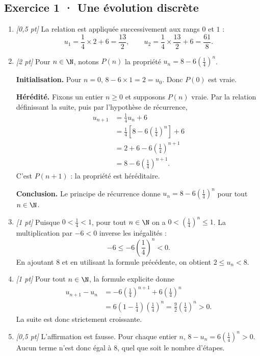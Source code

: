 \subsection*{Exercice 1 · Une évolution discrète}\begin{enumerate}

\item \textit{[0{,}5 pt]} La relation est appliquée successivement aux rangs $0$ et $1$ :\[u_1=\frac{1}{4}\times 2+6=\frac{13}{2},\qquad u_2=\frac{1}{4}\times \frac{13}{2}+6=\frac{61}{8}.\]

\item \textit{[2 pt]} Pour $n\in\N$, notons $P(n)$ la propriété $u_n=8-6\left(\frac{1}{4}\right)^n$.
\par\smallskip\textbf{Initialisation.} Pour $n=0$, $8-6\times1=2=u_0$. Donc $P(0)$ est vraie.
\par\smallskip\textbf{Hérédité.} Fixons un entier $n\ge0$ et supposons $P(n)$ vraie. Par la relation définissant la suite, puis par l'hypothèse de récurrence,
\[\begin{aligned}u_{n+1}&=\frac{1}{4}u_n+6\\
&=\frac{1}{4}\left[8-6\left(\frac{1}{4}\right)^n\right]+6\\
&=2+6-6\left(\frac{1}{4}\right)^{n+1}\\
&=8-6\left(\frac{1}{4}\right)^{n+1}.
\end{aligned}\]
C'est $P(n+1)$ : la propriété est héréditaire.
\par\smallskip\textbf{Conclusion.} Le principe de récurrence donne $u_n=8-6\left(\frac{1}{4}\right)^n$ pour tout $n\in\N$.

\item \textit{[1 pt]} Puisque $0<\frac{1}{4}<1$, pour tout $n\in\N$ on a $0<(\frac{1}{4})^n\le1$. La multiplication par $-6<0$ inverse les inégalités :
\[-6\le-6(\frac{1}{4})^n<0.\]
En ajoutant $8$ et en utilisant la formule précédente, on obtient $2\le u_n<8$.

\item \textit{[1 pt]} Pour tout $n\in\N$, la formule explicite donne
\[\begin{aligned}u_{n+1}-u_n&=-6(\frac{1}{4})^{n+1}+6(\frac{1}{4})^n\\&=6(1-\frac{1}{4})(\frac{1}{4})^n=\frac{9}{2}(\frac{1}{4})^n>0.\end{aligned}\]
La suite est donc strictement croissante.

\item \textit{[0{,}5 pt]} L'affirmation est fausse. Pour chaque entier $n$, $8-u_n=6(\frac{1}{4})^n>0$. Aucun terme n'est donc égal à $8$, quel que soit le nombre d'étapes.

\end{enumerate}

